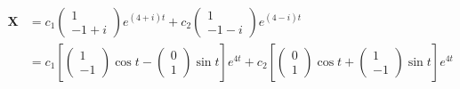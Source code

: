 \documentclass{article}
\begin{document}
\setcounter{subsubsection}{36}
\subsubsection{}

\begin{align*}
  \mathbf{X} & = c_1 \begin{pmatrix}
                       1 \\
                       -1 + i
                     \end{pmatrix} e^{(4 + i) t} + c_2 \begin{pmatrix}
                                                         1 \\
                                                         -1 - i
                                                       \end{pmatrix} e^{(4 - i) t}                                                                               \\
             & = c_1 \left[ \begin{pmatrix}
                                1 \\
                                -1
                              \end{pmatrix} \cos t - \begin{pmatrix}
                                                       0 \\
                                                       1
                                                     \end{pmatrix} \sin t \right] e^{4 t} + c_2 \left[ \begin{pmatrix}
                                                                                                         0 \\
                                                                                                         1
                                                                                                       \end{pmatrix} \cos t + \begin{pmatrix}
                                                                                                                                1 \\
                                                                                                                                -1
                                                                                                                              \end{pmatrix} \sin t \right] e^{4 t} \\

\end{align*}
\end{document}
